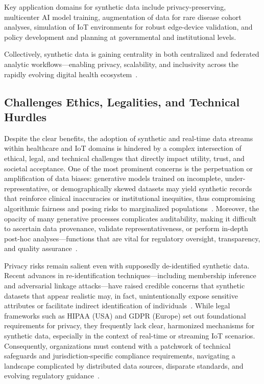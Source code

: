 \documentclass[sigconf]{acmart}
\begin{document}
Key application domains for synthetic data include privacy-preserving, multicenter AI model training, augmentation of data for rare disease cohort analyses, simulation of IoT environments for robust edge-device validation, and policy development and planning at governmental and institutional levels.

Collectively, synthetic data is gaining centrality in both centralized and federated analytic workflows—enabling privacy, scalability, and inclusivity across the rapidly evolving digital health ecosystem~\cite{ref91,ref106}.

\subsection{Challenges Ethics, Legalities, and Technical Hurdles}

Despite the clear benefits, the adoption of synthetic and real-time data streams within healthcare and IoT domains is hindered by a complex intersection of ethical, legal, and technical challenges that directly impact utility, trust, and societal acceptance. One of the most prominent concerns is the perpetuation or amplification of data biases: generative models trained on incomplete, under-representative, or demographically skewed datasets may yield synthetic records that reinforce clinical inaccuracies or institutional inequities, thus compromising algorithmic fairness and posing risks to marginalized populations~\cite{ref91,ref63}. Moreover, the opacity of many generative processes complicates auditability, making it difficult to ascertain data provenance, validate representativeness, or perform in-depth post-hoc analyses---functions that are vital for regulatory oversight, transparency, and quality assurance~\cite{ref106,ref50,ref54,ref84}.

Privacy risks remain salient even with supposedly de-identified synthetic data. Recent advances in re-identification techniques---including membership inference and adversarial linkage attacks---have raised credible concerns that synthetic datasets that appear realistic may, in fact, unintentionally expose sensitive attributes or facilitate indirect identification of individuals~\cite{ref91,ref106,ref51}. While legal frameworks such as HIPAA (USA) and GDPR (Europe) set out foundational requirements for privacy, they frequently lack clear, harmonized mechanisms for synthetic data, especially in the context of real-time or streaming IoT scenarios. Consequently, organizations must contend with a patchwork of technical safeguards and jurisdiction-specific compliance requirements, navigating a landscape complicated by distributed data sources, disparate standards, and evolving regulatory guidance~\cite{ref2,ref4,ref5,ref6,ref7,ref8,ref9,ref24,ref25,ref28,ref30,ref31,ref33,ref34,ref35,ref36,ref41,ref43,ref46,ref50,ref54,ref51,ref61,ref62,ref63,ref64,ref65,ref70,ref71,ref72,ref75,ref76,ref77,ref78,ref79,ref82,ref83,ref84,ref90,ref91}.
\end{document}
